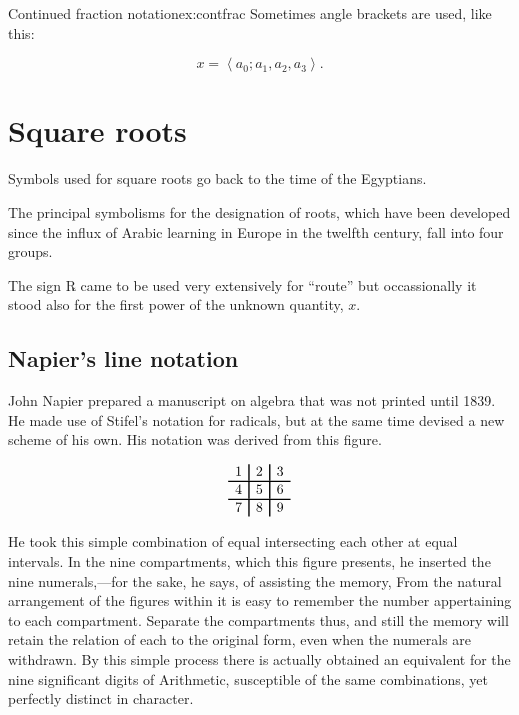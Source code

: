 {\begin{texexample}{Continued fraction notation}{ex:contfrac}
Sometimes angle brackets are used, like this:

\[ x = \left \langle a_0; a_1, a_2, a_3 \right \rangle. \]

\end{texexample}


\section{Square roots}

Symbols used for square roots go back to the time of the Egyptians. 

The principal symbolisms for the designation of roots, which have been developed since the influx of Arabic learning in Europe in the twelfth century, fall into four groups. 

The sign {\panunicode ℞} came to be used very extensively for \enquote{route} but occassionally it stood also for the first power of the unknown quantity, $x$.

\subsection*{Napier's line notation}

John Napier prepared a manuscript on algebra that was not printed until 1839. He made use of Stifel's notation for radicals, but at the same time devised a new scheme of his own. His notation was derived from this figure.

\[\arrayrulewidth1pt
\begin{array}{c|c|c}
1&2&3\\
\hline
4&5&6\\
\hline
7&8&9\\
\end{array}
\]


He took this simple combination
of equal  intersecting each other at equal
intervals. In the nine compartments, which this figure
presents, he inserted the nine numerals,---for the sake, he
says, of assisting the memory, From the natural arrangement of the figures within it is easy to remember the number appertaining to each compartment. Separate the
compartments thus,  and still the memory will retain
the relation of each to the original form, even when the
numerals are withdrawn. By this simple process there is
actually obtained an equivalent for the nine significant digits
of Arithmetic, susceptible of the same combinations, yet perfectly
distinct in character.

}
